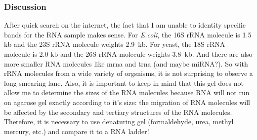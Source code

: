 \subsubsection{Discussion}

After quick search on the internet, the fact that I am unable to identity specific bands for the RNA sample makes sense. For \textit{E.coli}, the 16S rRNA molecule is 1.5 kb and the 23S rRNA molecule weights 2.9~kb. For yeast, the 18S rRNA molecule is 2.0 kb and the 26S rRNA molecule weights 3.8~kb. And there are also more smaller RNA molecules like \gls{mrna} and \gls{trna} (and maybe miRNA?). So with rRNA molecules from a wide variety of orgsnisms, it is not surprising to observe a long smearing lane. Also, it is important to keep in mind that this gel does not allow me to determine the sizes of the RNA molecules because RNA will not run on agarose gel exactly according to it's size: the migration of RNA molecules will be affected by the secondary and tertiary structures of the RNA molecules. Therefore, it is necessary to use denaturing gel (formaldehyde, urea, methyl mercury, etc.) and compare it to a RNA ladder!

